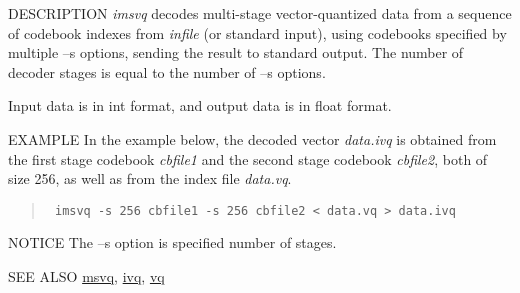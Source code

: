 \begin{synopsis}
\item [imsvq] [ --l $L$ ] [ --n $N$ ] [ --s $S \;$ {\em cbfile} ] [ {\em infile} ]
\end{synopsis}

\begin{qsection}{DESCRIPTION}
{\em imsvq} decodes multi-stage vector-quantized data 
from a sequence of codebook indexes from {\em infile} (or standard input), 
using codebooks specified by multiple --s options, 
sending the result to standard output. 
The number of decoder stages is equal to the number of --s options.

Input data is in int format, and output data is in float format.
\end{qsection}

\begin{options}
\end{options}

\begin{qsection}{EXAMPLE}
In the example below,
the decoded vector {\em data.ivq} is obtained
from the first stage codebook {\em cbfile1}
and the second stage codebook {\em cbfile2},
both of size 256, as well as from the index file {\em data.vq}.
\begin{quote}
\verb! imsvq -s 256 cbfile1 -s 256 cbfile2 < data.vq > data.ivq!
\end{quote}
\end{qsection}

\begin{qsection}{NOTICE}
The --s option is specified number of stages.
\end{qsection}

\begin{qsection}{SEE ALSO}
\hyperlink{msvq}{msvq},
\hyperlink{ivq}{ivq},
\hyperlink{vq}{vq}
\end{qsection}
